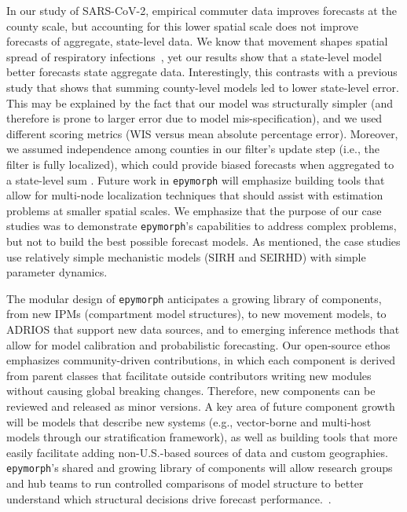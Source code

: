 In our study of SARS-CoV-2, empirical commuter data improves forecasts at the county scale, but accounting for this lower spatial scale does not improve forecasts of aggregate, state-level data. 
We know that movement shapes spatial spread of respiratory infections~\citep{pei_differential_2020,badr_association_2020}, yet our results show that a state-level model better forecasts state aggregate data. 
Interestingly, this contrasts with a previous study that shows that summing county-level models led to lower state-level error\citep{gopalakrishnan_globally_2021}.
This may be explained by the fact that our model was structurally simpler (and therefore is prone to larger error due to model mis-specification), and we used different scoring metrics (WIS versus mean absolute percentage error).
Moreover, we assumed independence among counties in our filter's update step (i.e., the filter is fully localized), which could provide biased forecasts when aggregated to a state-level sum
\citep{taieb_hierarchical_2021,panagiotelis_probabilistic_2023}.
Future work in \texttt{epymorph} will emphasize building tools that allow for multi-node localization techniques that should assist with estimation problems at smaller spatial scales.  
We emphasize that the purpose of our case studies was to demonstrate \texttt{epymorph}'s capabilities to address complex problems, but not to build the best possible forecast models. 
As mentioned, the case studies use relatively simple mechanistic models (SIRH and SEIRHD) with simple parameter dynamics. 

The modular design of \texttt{epymorph} anticipates a growing library of components, from new IPMs (compartment model structures), to new movement models, to ADRIOS that support new data sources, and to emerging inference methods that allow for model calibration and probabilistic forecasting.
Our open-source ethos emphasizes community-driven contributions, in which each component is derived from parent classes that facilitate outside contributors writing new modules without causing global breaking changes.
Therefore, new components can be reviewed and released as minor versions.
A key area of future component growth will be models that describe new systems (e.g., vector-borne and multi-host models through our stratification framework), as well as building tools that more easily facilitate adding non-U.S.-based sources of data and custom geographies.
\texttt{epymorph}'s shared and growing library of components will allow research groups and hub teams to run controlled comparisons of model structure to better understand which structural decisions drive forecast performance.~\citep{shea_harnessing_2020,reich_collaborative_2022}.

